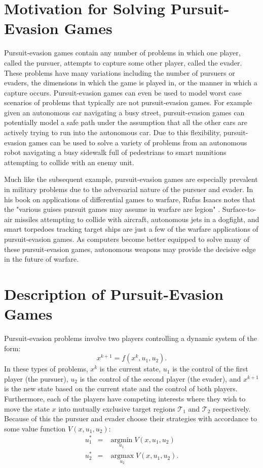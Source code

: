 \section{Motivation for Solving Pursuit-Evasion Games}
Pursuit-evasion games contain any number of problems in which one player, called the pursuer, attempts to capture some other player, called the evader. These problems have many variations including the number of pursuers or evaders, the dimensions in which the game is played in, or the manner in which a capture occurs. Pursuit-evasion games can even be used to model worst case scenarios of problems that typically are not pursuit-evasion games. For example given an autonomous car navigating a busy street, pursuit-evasion games can potentially model a safe path under the assumption that all the other cars are actively trying to run into the autonomous car. Due to this flexibility, pursuit-evasion games can be used to solve a variety of problems from an autonomous robot navigating a busy sidewalk full of pedestrians to smart munitions attempting to collide with an enemy unit.

Much like the subsequent example, pursuit-evasion games are especially prevalent in military problems due to the adversarial nature of the pursuer and evader. In his book on applications of differential games to warfare, Rufus Isaacs notes that the "various guises pursuit games may assume in warfare are legion" \cite{isaacs}. Surface-to-air missiles attempting to collide with aircraft, autonomous jets in a dogfight, and smart torpedoes tracking target ships are just a few of the warfare applications of pursuit-evasion games. As computers become better equipped to solve many of these pursuit-evasion games, autonomous weapons may provide the decisive edge in the future of warfare.  
        
\section{Description of Pursuit-Evasion Games}\label{pegames}
Pursuit-evasion problems involve two players controlling a dynamic system of the form: 
\begin{equation}
x^{k+1}=f(x^k, u_1, u_2).
\end{equation}
In these types of problems, $x^k$ is the current state, $u_1$ is the control of the first player (the pursuer), $u_2$ is the control of the second player (the evader), and $x^{k+1}$ is the new state based on the current state and the control of both players. Furthermore, each of the players have competing interests where they wish to move the state $x$ into mutually exclusive target regions $\mathscr{T}_1$ and $\mathscr{T}_2$ respectively. Because of this the pursuer and evader choose their strategies with accordance to some value function $V(x,u_1,u_2)$: 
\begin{eqnarray}\label{gameqn}
u_1^* & = & \underset{u_1}{\operatorname{argmin}}V(x,u_1,u_2)\\
u_2^* & = & \underset{u_2}{\operatorname{argmax}}V(x,u_1,u_2).
\end{eqnarray}


